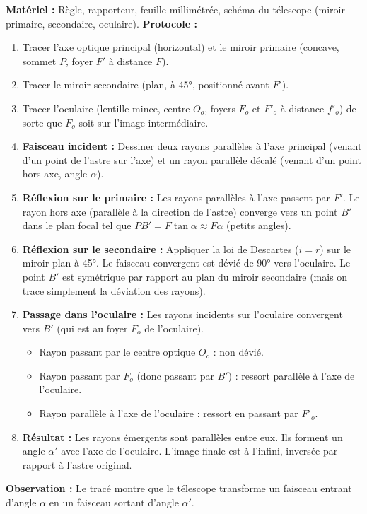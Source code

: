 \documentclass[11pt]{article}
\begin{document}
\begin{experience}
\textbf{Matériel :} Règle, rapporteur, feuille millimétrée, schéma du télescope (miroir primaire, secondaire, oculaire).
\textbf{Protocole :}
\begin{enumerate}
    \item Tracer l'axe optique principal (horizontal) et le miroir primaire (concave, sommet $P$, foyer $F'$ à distance $F$).
    \item Tracer le miroir secondaire (plan, à 45°, positionné avant $F'$).
    \item Tracer l'oculaire (lentille mince, centre $O_o$, foyers $F_o$ et $F'_o$ à distance $f'_o$) de sorte que $F_o$ soit sur l'image intermédiaire.
    \item \textbf{Faisceau incident :} Dessiner deux rayons parallèles à l'axe principal (venant d'un point de l'astre sur l'axe) et un rayon parallèle décalé (venant d'un point hors axe, angle $\alpha$).
    \item \textbf{Réflexion sur le primaire :} Les rayons parallèles à l'axe passent par $F'$. Le rayon hors axe (parallèle à la direction de l'astre) converge vers un point $B'$ dans le plan focal tel que $PB' = F \tan \alpha \approx F \alpha$ (petits angles).
    \item \textbf{Réflexion sur le secondaire :} Appliquer la loi de Descartes ($i=r$) sur le miroir plan à 45°. Le faisceau convergent est dévié de 90° vers l'oculaire. Le point $B'$ est symétrique par rapport au plan du miroir secondaire (mais on trace simplement la déviation des rayons).
    \item \textbf{Passage dans l'oculaire :} Les rayons incidents sur l'oculaire convergent vers $B'$ (qui est au foyer $F_o$ de l'oculaire).
    \begin{itemize}
        \item Rayon passant par le centre optique $O_o$ : non dévié.
        \item Rayon passant par $F_o$ (donc passant par $B'$) : ressort parallèle à l'axe de l'oculaire.
        \item Rayon parallèle à l'axe de l'oculaire : ressort en passant par $F'_o$.
    \end{itemize}
    \item \textbf{Résultat :} Les rayons émergents sont parallèles entre eux. Ils forment un angle $\alpha'$ avec l'axe de l'oculaire. L'image finale est à l'infini, inversée par rapport à l'astre original.
\end{enumerate}
\textbf{Observation :} Le tracé montre que le télescope transforme un faisceau entrant d'angle $\alpha$ en un faisceau sortant d'angle $\alpha'$.
\end{experience}
\end{document}
